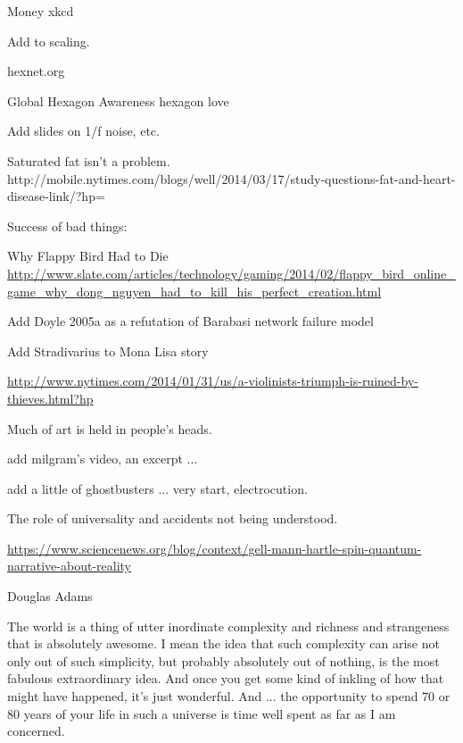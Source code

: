   Money 
  xkcd 

  Add to scaling.










  

  hexnet.org

  Global Hexagon Awareness
  hexagon love


  Add slides on 1/f noise, etc.

  Saturated fat isn't a problem.
http://mobile.nytimes.com/blogs/well/2014/03/17/study-questions-fat-and-heart-disease-link/?hp=

  
  Success of bad things:

  Why Flappy Bird Had to Die
  \url{http://www.slate.com/articles/technology/gaming/2014/02/flappy_bird_online_game_why_dong_nguyen_had_to_kill_his_perfect_creation.html}


  Add Doyle 2005a
  as a refutation of 
  Barabasi network failure model
  

  Add Stradivarius to Mona Lisa story

\url{http://www.nytimes.com/2014/01/31/us/a-violinists-triumph-is-ruined-by-thieves.html?hp}

  Much of art is held in people's heads.


add milgram's video, an excerpt ...

add a little of ghostbusters ...
very start, electrocution.
  


  The role of universality and accidents not being understood.
  
  \url{https://www.sciencenews.org/blog/context/gell-mann-hartle-spin-quantum-narrative-about-reality}


  
Douglas Adams

The world is a thing of utter inordinate complexity and richness and
strangeness that is absolutely awesome. I mean the idea that such
complexity can arise not only out of such simplicity, but probably
absolutely out of nothing, is the most fabulous extraordinary
idea. And once you get some kind of inkling of how that might have
happened, it's just wonderful. And ... the opportunity to spend 70 or 80
years of your life in such a universe is time well spent as far as I
am concerned.

